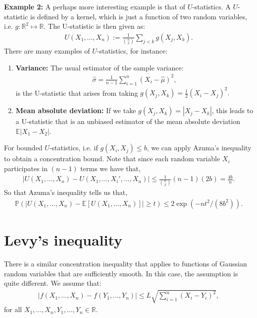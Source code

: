 \documentclass[twoside,12pt]{article}
\begin{document}
{\bf Example 2: } A perhaps more interesting example is that of $U$-statistics. A $U$-statistic is defined by a kernel, which is just a function of two random variables, i.e. $g: \mathbb{R}^2 \mapsto \mathbb{R}$. The U-statistic is then given as:
\begin{align*}
U(X_1,\ldots,X_n) := \frac{1}{ {n \choose 2} } \sum_{j < k} g(X_j, X_k).
\end{align*}
There are many examples of $U$-statistics, for instance:
\begin{enumerate}
\item {\bf Variance: } The usual estimator of the sample variance:
\begin{align*}
\widehat{\sigma} = \frac{1}{n-1} \sum_{i=1}^n (X_i - \widehat{\mu})^2,
\end{align*}
is the U-statistic that arises from taking $g(X_j, X_k) = \frac{1}{2} (X_i - X_j)^2.$
\item {\bf Mean absolute deviation: } If we take $g(X_j, X_k) = |X_j - X_k|$, this leads to a U-statistic that is an unbiased estimator of the mean absolute deviation $\mathbb{E}|X_1 - X_2|$.
\end{enumerate}

For bounded $U$-statistics, i.e. if $g(X_i, X_j) \leq b$, we can apply Azuma's inequality to obtain a concentration bound. Note that since each random variable $X_i$ participates in $(n-1)$ terms we have that,
\begin{align*}
|U(X_1,\ldots,X_n) - U(X_1,\ldots,X_i',\ldots, X_n)| \leq \frac{1}{{n \choose 2}} (n-1)(2b) = \frac{4b}{n}.
\end{align*}
So that Azuma's inequality tells us that,
\begin{align*}
\mathbb{P}(|U(X_1,\ldots,X_n) - \mathbb{E}[U(X_1,\ldots,X_n)] | \geq t) \leq 2 \exp (-nt^2/(8b^2)).
\end{align*}

\section{Levy's inequality}
There is a similar concentration inequality that applies to functions of Gaussian random variables that are sufficiently smooth. In this case, the assumption is quite different. We assume that:
\begin{align*}
|f(X_1,\ldots,X_n) - f(Y_1,\ldots,Y_n)| \leq L \sqrt{\sum_{i=1}^n (X_i - Y_i)^2},
\end{align*}
for all $X_1,\ldots,X_n,Y_1,\ldots,Y_n \in \mathbb{R}$.
\end{document}
